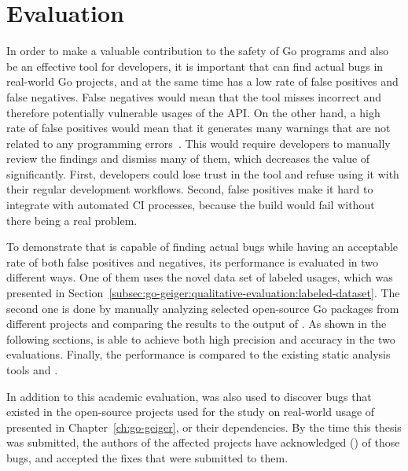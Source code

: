 
\section{Evaluation}\label{sec:go-safer:evaluation}

In order to make a valuable contribution to the safety of Go programs and also be an effective tool for developers, it
is important that \toolSafer{} can find actual bugs in real-world Go projects, and at the same time has a low rate of
false positives and false negatives.
False negatives would mean that the tool misses incorrect and therefore potentially vulnerable usages of the \unsafe{}
\acrshort{API}.
On the other hand, a high rate of false positives would mean that it generates many warnings that are not related to
any programming errors~\cite{banerjee2009}.
This would require developers to manually review the findings and dismiss many of them, which decreases the value of
\toolSafer{} significantly.
First, developers could lose trust in the tool and refuse using it with their regular development workflows.
Second, false positives make it hard to integrate \toolSafer{} with automated \acrshort{CI} processes, because the build
would fail without there being a real problem.

To demonstrate that \toolSafer{} is capable of finding actual bugs while having an acceptable rate of both false
positives and negatives, its performance is evaluated in two different ways.
One of them uses the novel data set of labeled \unsafe{} usages, which was presented in
Section~\ref{subsec:go-geiger:qualitative-evaluation:labeled-dataset}.
The second one is done by manually analyzing  selected open-source Go packages from different projects and
comparing the results to the output of \toolSafer{}.
As shown in the following sections, \toolSafer{} is able to achieve both high precision and accuracy in the two
evaluations.
Finally, the performance is compared to the existing static analysis tools \toolVet{} and \toolGosec{}.

In addition to this academic evaluation, \toolSafer{} was also used to discover \numberBugsFixed{} bugs that existed in
the open-source projects used for the study on real-world usage of \unsafe{} presented in Chapter~\ref{ch:go-geiger}, or
their dependencies.
By the time this thesis was submitted, the authors of the affected projects have acknowledged \numberBugsMerged{}
(\fractionBugsMerged{}) of those bugs, and accepted the fixes that were submitted to them.


